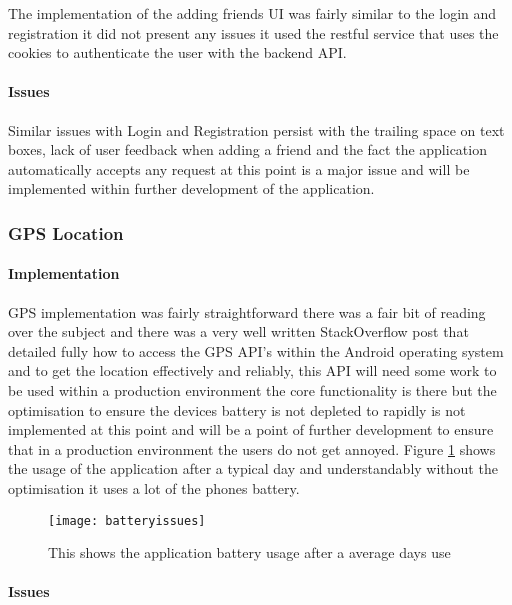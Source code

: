 The implementation of the adding friends UI was fairly similar to the login and registration it did not present any issues it used the restful service that uses the cookies to authenticate the user with the backend API.

\paragraph*{Issues}

Similar issues with Login and Registration persist with the trailing space on text boxes, lack of user feedback when adding a friend and the fact the application automatically accepts any request at this point is a major issue and will be implemented within further development of the application.


\subsubsection*{GPS Location}

\paragraph*{Implementation}

GPS implementation was fairly straightforward there was a fair bit of reading over the subject and there was a very well written StackOverflow post \cite{mudit:HowdoIgetthecurrentGPSlocationprogrammaticallyinAndroid:2009:online} that detailed fully how to access the GPS API's within the Android operating system and to get the location effectively and reliably, this API will need some work to be used within a production environment the core functionality is there but the optimisation to ensure the devices battery is not depleted to rapidly is not implemented at this point and will be a point of further development to ensure that in a production environment the users do not get annoyed. Figure \ref{fig:battery_issues} shows the usage of the application after a typical day and understandably without the optimisation it uses a lot of the phones battery.

\begin{figure}[H]
    \centering
    \texttt{[image: batteryissues]}
    \caption{This shows the application battery usage after a average days use}
    \label{fig:battery_issues}
\end{figure} 

\paragraph*{Issues}

